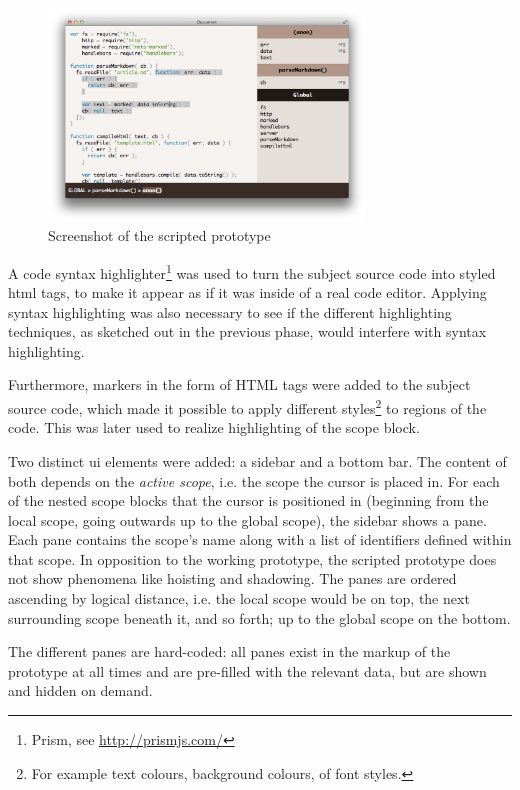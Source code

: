 \begin{figure}[htbp]
\centering
\includegraphics[keepaspectratio,width=0.75\textwidth,height=0.75\textheight]{img/prototype-1.png}
\caption{Screenshot of the scripted prototype}
\label{fig:scriptedprototype}
\end{figure}

A code syntax highlighter\footnote{Prism, see \url{http://prismjs.com/}}
was used to turn the subject source code into styled \ac{html} tags, to
make it appear as if it was inside of a real code editor. Applying
syntax highlighting was also necessary to see if the different
highlighting techniques, as sketched out in the previous phase, would
interfere with syntax highlighting.

Furthermore, markers in the form of HTML tags were added to the subject
source code, which made it possible to apply different
styles\footnote{For example text colours, background colours, of font styles.}
to regions of the code. This was later used to realize highlighting of
the scope block.

Two distinct \ac{ui} elements were added: a sidebar and a bottom bar.
The content of both depends on the \emph{active scope}, i.e. the scope
the cursor is placed in. For each of the nested scope blocks that the
cursor is positioned in (beginning from the local scope, going outwards
up to the global scope), the sidebar shows a pane. Each pane contains
the scope’s name along with a list of identifiers defined within that
scope. In opposition to the working prototype, the scripted prototype
does not show phenomena like hoisting and shadowing. The panes are
ordered ascending by logical distance, i.e. the local scope would be on
top, the next surrounding scope beneath it, and so forth; up to the
global scope on the bottom.

The different panes are hard-coded: all panes exist in the markup of the
prototype at all times and are pre-filled with the relevant data, but
are shown and hidden on demand.

